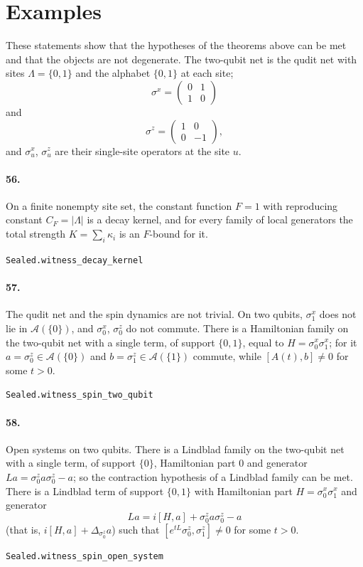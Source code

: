 \documentclass[11pt]{article}
\begin{document}
\section*{Examples}
These statements show that the hypotheses of the theorems above can be met and that the objects are not degenerate. The two-qubit net is the qudit net with sites $\Lambda = \{0, 1\}$ and the alphabet $\{0, 1\}$ at each site; \[\sigma^x = \begin{pmatrix} 0 & 1 \\ 1 & 0 \end{pmatrix}\] and \[\sigma^z = \begin{pmatrix} 1 & 0 \\ 0 & -1 \end{pmatrix},\] and $\sigma^x_u$, $\sigma^z_u$ are their single-site operators at the site $u$.

\paragraph{56.} On a finite nonempty site set, the constant function $F = 1$ with reproducing constant $C_F = |\Lambda|$ is a decay kernel, and for every family of local generators the total strength $K = \sum_i \kappa_i$ is an $F$-bound for it.\par{\footnotesize\texttt{Sealed.witness\_decay\_kernel}}

\paragraph{57.} The qudit net and the spin dynamics are not trivial. On two qubits, $\sigma^x_1$ does not lie in $\mathcal A(\{0\})$, and $\sigma^x_0$, $\sigma^z_0$ do not commute. There is a Hamiltonian family on the two-qubit net with a single term, of support $\{0, 1\}$, equal to $H = \sigma^x_0 \sigma^x_1$; for it $a = \sigma^z_0 \in \mathcal A(\{0\})$ and $b = \sigma^z_1 \in \mathcal A(\{1\})$ commute, while $[A(t), b] \neq 0$ for some $t > 0$.\par{\footnotesize\texttt{Sealed.witness\_spin\_two\_qubit}}

\paragraph{58.} Open systems on two qubits. There is a Lindblad family on the two-qubit net with a single term, of support $\{0\}$, Hamiltonian part $0$ and generator $L a = \sigma^z_0 a \sigma^z_0 - a$; so the contraction hypothesis of a Lindblad family can be met. There is a Lindblad term of support $\{0, 1\}$ with Hamiltonian part $H = \sigma^x_0 \sigma^x_1$ and generator \[L a = i[H, a] + \sigma^z_0 a \sigma^z_0 - a\] (that is, $i[H, a] + \Delta_{\sigma^z_0} a$) such that $[e^{tL} \sigma^z_0, \sigma^z_1] \neq 0$ for some $t > 0$.\par{\footnotesize\texttt{Sealed.witness\_spin\_open\_system}}
\end{document}
